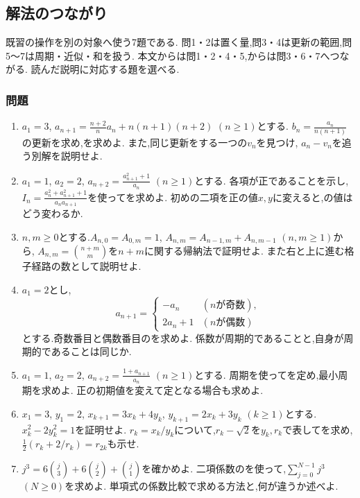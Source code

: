 \subsection{解法のつながり}\label{節：接続演習}
  既習の操作を別の対象へ使う7題である.
                問1・2は置く量,問3・4は更新の範囲,問5〜7は周期・近似・和を扱う.
                本文からは問1・2・4・5,からは問3・6・7へつながる.
                読んだ説明に対応する題を選べる.

  \subsubsection{問題}
  \begin{enumerate}[label=\textbf{問\arabic*.},format=\bookitemlink{practice-connections}{problem}{answer}]
    \item $a_1=3$,
      $a_{n+1}=\frac{n+2}{n}a_n+n(n+1)(n+2)$ $(n\ge1)$とする.
      $b_n=\frac{a_n}{n(n+1)}$の更新を求め,を求めよ.
      また,同じ更新をする一つの$v_n$を見つけ,
      $a_n-v_n$を追う別解を説明せよ.
    \item $a_1=1$, $a_2=2$,
      $a_{n+2}=\frac{a_{n+1}^2+1}{a_n}$ $(n\ge1)$とする.
      各項が正であることを示し,
      $I_n=\frac{a_n^2+a_{n+1}^2+1}{a_na_{n+1}}$を使ってを求めよ.
      初めの二項を正の値$x,y$に変えると,の値はどう変わるか.
    \item $n,m\ge0$とする.$A_{n,0}=A_{0,m}=1$,
      $A_{n,m}=A_{n-1,m}+A_{n,m-1}$ $(n,m\ge1)$から,
      $A_{n,m}=\binom{n+m}{m}$を$n+m$に関する帰納法で証明せよ.
      また右と上に進む格子経路の数として説明せよ.
    \item $a_1=2$とし,
      \[
        a_{n+1}=\begin{cases}
          -a_n&(n\text{が奇数}),\\
          2a_n+1&(n\text{が偶数})
        \end{cases}
      \]
      とする.奇数番目と偶数番目のを求めよ.
      係数が周期的であることと,自身が周期的であることは同じか.
    \item $a_1=1$, $a_2=2$,
      $a_{n+2}=\frac{1+a_{n+1}}{a_n}$ $(n\ge1)$とする.
      周期を使ってを定め,最小周期を求めよ.
      正の初期値を変えて定となる場合も求めよ.
    \item $x_1=3$, $y_1=2$,
      $x_{k+1}=3x_k+4y_k$, $y_{k+1}=2x_k+3y_k$ $(k\ge1)$とする.
      $x_k^2-2y_k^2=1$を証明せよ.
      $r_k=x_k/y_k$について,$r_k-\sqrt2$を$y_k,r_k$で表してを求め,
      $\frac12(r_k+2/r_k)=r_{2k}$も示せ.
    \item $j^3=6\binom j3+6\binom j2+\binom j1$を確かめよ.
      二項係数のを使って,$\sum_{j=0}^{N-1}j^3$ $(N\ge0)$を求めよ.
      単項式の係数比較で求める方法と,何が違うか述べよ.
  \end{enumerate}

